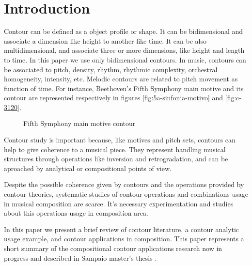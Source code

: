 

\section{Introduction}
\label{sec:introduction}

Contour can be defined as a object profile or shape. It can be
bidimensional and associate a dimension like height to another like
time. It can be also multidimensional, and associate three or more
dimensions, like height and length to time. In this paper we use only
bidimensional contours. In music, contours can be associated to pitch,
density, rhythm, rhythmic complexity, orchestral homogeneity,
intensity, etc. Melodic contours are related to pitch movement as
function of time. For instance, Beethoven's Fifth Symphony main motive
and its contour are represented respectively in figures
\ref{fig:5a-sinfonia-motivo} and \ref{fig:c-3120}.

\begin{figure}[!p]
  \centering
  \subfloat[Contour (3 1 2 0)]{
    \texttt{[image: c-3120]}
    \label{fig:c-3120}
  }
  \caption{Fifth Symphony main motive contour}
  \label{fig:5a-sinfonia}
\end{figure}

Contour study is important because, like motives and pitch sets,
contours can help to give coherence to a musical piece. They represent
handling musical structures through operations like inversion and
retrogradation, and can be aproached by analytical or compositional
points of view.

Despite the possible coherence given by contours and the operations
provided by contour theories, systematic studies of contour operations
and combinations usage in musical composition are scarce. It's
necessary experimentation and studies about this operations usage in
composition area.

In this paper we present a brief review of contour literature, a
contour analytic usage example, and contour applications in
composition. This paper represents a short summary of the
compositional contour applications research now in progress and
described in Sampaio master's thesis \cite{sampaio08:em}.

